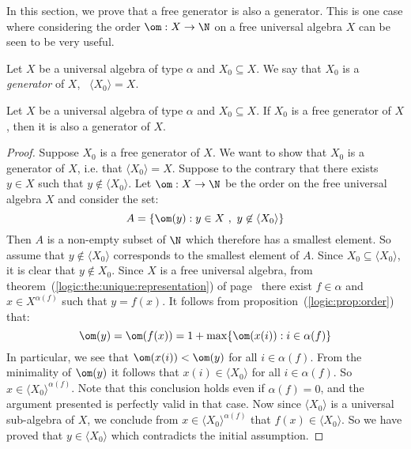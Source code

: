 In this section, we prove that a free generator is also a generator.
This is one case where considering the order $\om:X\to\N$ on a free
universal algebra $X$ can be seen to be very useful.
\begin{defin}\label{logic:def:generator}
Let $X$ be a universal algebra of type $\alpha$ and $X_{0}\subseteq
X$. We say that $X_{0}$ is a {\em generator} of $X$, \ifand\
$\langle X_{0}\rangle =X$.
\end{defin}
\begin{prop}\label{logic:prop:free:generator:generator}
Let $X$ be a universal algebra of type $\alpha$ and $X_{0}\subseteq
X$. If $X_{0}$ is a free generator of $X$, then it is also a
generator of $X$.
\end{prop}
\begin{proof}
Suppose $X_{0}$ is a free generator of $X$. We want to show that
$X_{0}$ is a generator of $X$, i.e. that $\langle X_{0}\rangle =X$.
Suppose to the contrary that there exists $y\in X$ such that
$y\not\in\langle X_{0}\rangle$. Let $\om:X\to\N$ be the order on the
free universal algebra $X$ and consider the set:
    \[
    A=\{\om(y):y\in X\ ,\ y\not\in\langle X_{0}\rangle\}
    \]
Then $A$ is a non-empty subset of $\N$ which therefore has a
smallest element. So assume that $y\not\in\langle X_{0}\rangle$
corresponds to the smallest element of $A$. Since
$X_{0}\subseteq\langle X_{0}\rangle$, it is clear that $y\not\in
X_{0}$. Since $X$ is a free universal algebra, from
theorem~(\ref{logic:the:unique:representation}) of
page~\pageref{logic:the:unique:representation} there exist
$f\in\alpha$ and $x\in X^{\alpha(f)}$ such that $y=f(x)$. It follows
from proposition~(\ref{logic:prop:order}) that:
    \[
    \om(y)=\om(f(x))=1+\max\{\om(x(i)):i\in\alpha(f)\}
    \]
In particular, we see that $\om(x(i))<\om(y)$ for all
$i\in\alpha(f)$. From the minimality of $\om(y)$ it follows that
$x(i)\in\langle X_{0}\rangle$ for all $i\in\alpha(f)$. So
$x\in\langle X_{0}\rangle^{\alpha(f)}$. Note that this conclusion
holds even if $\alpha(f)=0$, and the argument presented is perfectly
valid in that case. Now since $\langle X_{0}\rangle$ is a universal
sub-algebra of $X$, we conclude from $x\in\langle
X_{0}\rangle^{\alpha(f)}$ that $f(x)\in\langle X_{0}\rangle$. So we
have proved that $y\in\langle X_{0}\rangle$ which contradicts the
initial assumption.
\end{proof}

